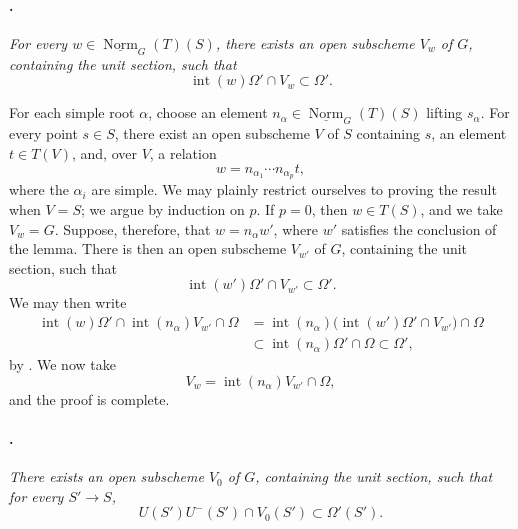 \paragraph{.}
{\itshape For every
\(w\in\underline{\operatorname{Norm}}_G(T)(S)\), there exists an
open subscheme \(V_w\) of \(G\), containing the unit section, such
that
\[
  \operatorname{int}(w)\Omega'\cap V_w\subset\Omega'.
\]}

For each simple root \(\alpha\), choose an element
\(n_\alpha\in\underline{\operatorname{Norm}}_G(T)(S)\) lifting
\(s_\alpha\). For every point \(s\in S\), there exist an open
subscheme \(V\) of \(S\) containing \(s\), an element \(t\in T(V)\),
and, over \(V\), a relation
\[
  w=n_{\alpha_1}\cdots n_{\alpha_p}t,
\]
where the \(\alpha_i\) are simple. We may plainly restrict ourselves
to proving the result when \(V=S\); we argue by induction on \(p\).
If \(p=0\), then \(w\in T(S)\), and we take \(V_w=G\). Suppose,
therefore, that \(w=n_\alpha w'\), where \(w'\) satisfies the
conclusion of the lemma. There is then an open subscheme \(V_{w'}\)
of \(G\), containing the unit section, such that
\[
  \operatorname{int}(w')\Omega'\cap V_{w'}\subset\Omega'.
\]
We may then write
\[
\begin{aligned}
  \operatorname{int}(w)\Omega'
    \cap\operatorname{int}(n_\alpha)V_{w'}\cap\Omega
  &=
  \operatorname{int}(n_\alpha)
  \bigl(\operatorname{int}(w')\Omega'\cap V_{w'}\bigr)\cap\Omega\\
  &\subset
  \operatorname{int}(n_\alpha)\Omega'\cap\Omega
  \subset\Omega',
\end{aligned}
\]
by . We now take
\[
  V_w=\operatorname{int}(n_\alpha)V_{w'}\cap\Omega,
\]
and the proof is complete.

\paragraph{.}
{\itshape There exists an open subscheme \(V_0\) of \(G\),
containing the unit section, such that for every \(S'\to S\),
\[
  U(S')U^-(S')\cap V_0(S')\subset\Omega'(S').
\]}

